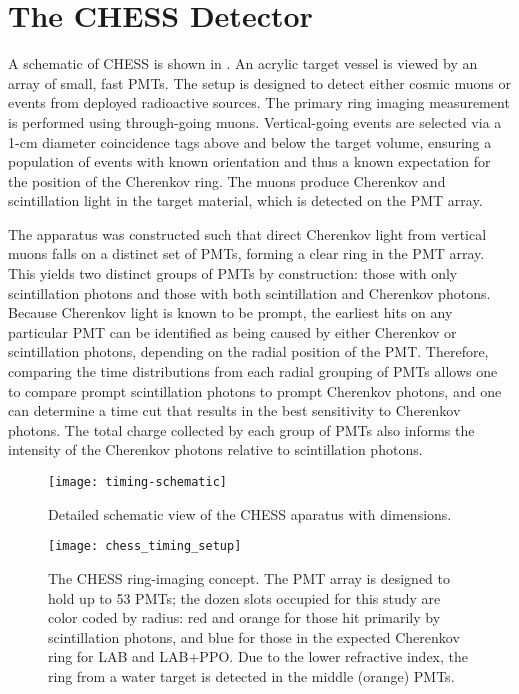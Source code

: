 \section{The CHESS Detector}\label{s:desc}

A schematic of CHESS is shown in .  
An acrylic target vessel is viewed by an array of small, fast PMTs. 
The setup is designed to detect either cosmic muons or events from deployed radioactive sources.  
The primary ring imaging measurement is performed using through-going muons.  
Vertical-going events are selected via a 1-cm diameter coincidence tags above and below the target volume, ensuring a population of events with known orientation and thus a known expectation for the position of the Cherenkov ring. 
The muons produce Cherenkov and scintillation light in the target material, which is detected on the PMT array. 

The apparatus was constructed such that direct Cherenkov light from vertical muons falls on a distinct set of PMTs, forming a clear ring in the PMT array.
This yields two distinct groups of PMTs by construction: those with only scintillation photons and those with both scintillation and Cherenkov photons. 
Because Cherenkov light is known to be prompt, the earliest hits on any particular PMT can be identified as being caused by either Cherenkov or scintillation photons, depending on the radial position of the PMT.
Therefore, comparing the time distributions from each radial grouping of PMTs allows one to compare prompt scintillation photons to prompt Cherenkov photons, and one can determine a time cut that results in the best sensitivity to Cherenkov photons.
The total charge collected by each group of PMTs also informs the intensity of the Cherenkov photons relative to scintillation photons.

\begin{figure}
\centering
\texttt{[image: timing-schematic]}
\caption{Detailed schematic view of the CHESS aparatus with dimensions.}
\label{fig:timing-setup}
\end{figure}

\begin{figure}
\centering
\texttt{[image: chess\_timing\_setup]}
\caption{The CHESS ring-imaging concept. The PMT array is designed to hold up to 53 PMTs; the dozen slots occupied for this study are color coded by radius: red and orange for those hit primarily by scintillation photons, and blue for those in the expected Cherenkov ring for LAB and LAB+PPO. Due to the lower refractive index, the ring from a water target is detected in the middle (orange) PMTs. }
\label{fig:timing-setup-2}
\end{figure}


